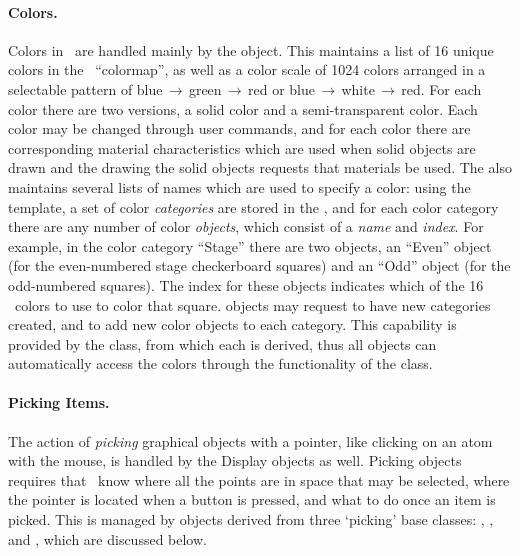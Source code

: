\paragraph{Colors.}
Colors in \VMD\ are handled mainly by the  object.  This maintains a list of 16 unique colors in the \VMD\ ``colormap'', as well as a color scale of 1024 colors arranged in a selectable pattern of blue\,$\rightarrow$\,green\,$\rightarrow$\,red or blue\,$\rightarrow$\,white\,$\rightarrow$\,red.  For each color there are two versions, a solid color and a semi-transparent color.  Each color may be changed through user commands, and for each color there are corresponding material characteristics which are used when solid objects are drawn and the  drawing the solid objects requests that materials be used.  The  also maintains several lists of names which are used to specify a color: using the  template, a set of color {\em categories} are stored in the , and for each color category there are any number of color {\em objects}, which consist of a {\em name} and {\em index}.  For example, in the color category ``Stage'' there are two objects, an ``Even'' object (for the even-numbered stage checkerboard squares) and an ``Odd'' object (for the odd-numbered squares).  The index for these objects indicates which of the 16 \VMD\ colors to use to color that square.   objects may request to have new categories created, and to add new color objects to each category.  This capability is provided by the  class, from which each  is derived, thus all objects can automatically access the colors through the functionality of the  class.

\paragraph{Picking Items.}
The action of {\em picking} graphical objects with a pointer, like clicking on an atom with the mouse, is handled by the Display objects as well.  Picking objects requires that \VMD\ know where all the points are in space that may be selected, where the pointer is located when a button is pressed, and what to do once an item is picked.  This is managed by objects derived from three `picking' base classes: , , and , which are discussed below.

